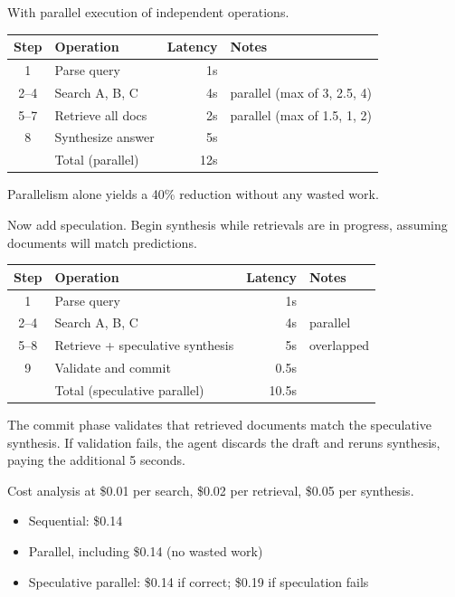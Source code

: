 With parallel execution of independent operations.

\begin{center}
\begin{tabular}{clrl}
\toprule
Step & Operation & Latency & Notes \\
\midrule
1 & Parse query & 1s & \\
2--4 & Search A, B, C & 4s & parallel (max of 3, 2.5, 4) \\
5--7 & Retrieve all docs & 2s & parallel (max of 1.5, 1, 2) \\
8 & Synthesize answer & 5s & \\
\midrule
& Total (parallel) & 12s & \\
\bottomrule
\end{tabular}
\end{center}

Parallelism alone yields a 40\% reduction without any wasted work.

Now add speculation. Begin synthesis while retrievals are in progress, assuming documents will match predictions.

\begin{center}
\begin{tabular}{clrl}
\toprule
Step & Operation & Latency & Notes \\
\midrule
1 & Parse query & 1s & \\
2--4 & Search A, B, C & 4s & parallel \\
5--8 & Retrieve + speculative synthesis & 5s & overlapped \\
9 & Validate and commit & 0.5s & \\
\midrule
& Total (speculative parallel) & 10.5s & \\
\bottomrule
\end{tabular}
\end{center}

The commit phase validates that retrieved documents match the speculative synthesis. If validation fails, the agent discards the draft and reruns synthesis, paying the additional 5 seconds.

Cost analysis at \$0.01 per search, \$0.02 per retrieval, \$0.05 per synthesis.
\begin{itemize}
\item Sequential: \$0.14
\item Parallel, including \$0.14 (no wasted work)
\item Speculative parallel: \$0.14 if correct; \$0.19 if speculation fails
\end{itemize}

